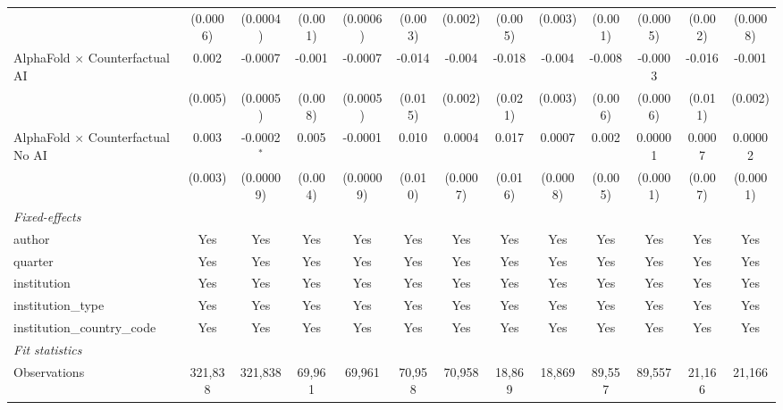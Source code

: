 \begin{tabular}{lcccccccccccc}
                                            & (0.0006)      & (0.0004)      & (0.001) & (0.0006)      & (0.003)     & (0.002)       & (0.005) & (0.003)       & (0.001)  & (0.0005) & (0.002) & (0.0008)\\   
   AlphaFold $\times$ Counterfactual AI     & 0.002         & -0.0007       & -0.001  & -0.0007       & -0.014      & -0.004        & -0.018  & -0.004        & -0.008   & -0.0003  & -0.016  & -0.001\\   
                                            & (0.005)       & (0.0005)      & (0.008) & (0.0005)      & (0.015)     & (0.002)       & (0.021) & (0.003)       & (0.006)  & (0.0006) & (0.011) & (0.002)\\   
   AlphaFold $\times$ Counterfactual No AI  & 0.003         & -0.0002$^{*}$ & 0.005   & -0.0001       & 0.010       & 0.0004        & 0.017   & 0.0007        & 0.002    & 0.00001  & 0.0007  & 0.00002\\   
                                            & (0.003)       & (0.00009)     & (0.004) & (0.00009)     & (0.010)     & (0.0007)      & (0.016) & (0.0008)      & (0.005)  & (0.0001) & (0.007) & (0.0001)\\   
   \midrule
   \emph{Fixed-effects}\\
   author                                   & Yes           & Yes           & Yes     & Yes           & Yes         & Yes           & Yes     & Yes           & Yes      & Yes      & Yes     & Yes\\  
   quarter                                  & Yes           & Yes           & Yes     & Yes           & Yes         & Yes           & Yes     & Yes           & Yes      & Yes      & Yes     & Yes\\  
   institution                              & Yes           & Yes           & Yes     & Yes           & Yes         & Yes           & Yes     & Yes           & Yes      & Yes      & Yes     & Yes\\  
   institution\_type                        & Yes           & Yes           & Yes     & Yes           & Yes         & Yes           & Yes     & Yes           & Yes      & Yes      & Yes     & Yes\\  
   institution\_country\_code               & Yes           & Yes           & Yes     & Yes           & Yes         & Yes           & Yes     & Yes           & Yes      & Yes      & Yes     & Yes\\  
   \midrule
   \emph{Fit statistics}\\
   Observations                             & 321,838       & 321,838       & 69,961  & 69,961        & 70,958      & 70,958        & 18,869  & 18,869        & 89,557   & 89,557   & 21,166  & 21,166\\  

\end{tabular}
